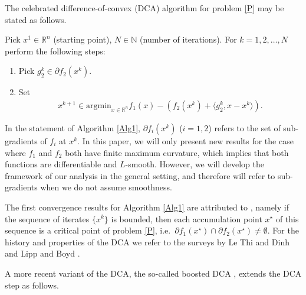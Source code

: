 \documentclass{article} %
\begin{document}
The celebrated difference-of-convex (DCA) algorithm for problem \eqref{P} may be stated as follows.

\begin{algorithm}[H]
\caption{DCA}
\begin{algorithmic}\label{Alg1}
\STATE Pick $x^1\in\mathbb{R}^n$ (starting point), $N \in \mathbb{N}$ (number of iterations).
\STATE For $k=1, 2, \ldots, N$ perform the following steps:\\
\begin{enumerate}
\item Pick  $g_2^{k}\in\partial f_2(x^{k})$.
\item
Set
\begin{align*}
  x^{k+1}\in \text{argmin}_{x\in\mathbb{R}^n} f_1(x)-\left(f_2(x^k)+\langle g_2^k, x-x^k\rangle\right).
\end{align*}
\end{enumerate}
\end{algorithmic}
\end{algorithm}
In the statement of Algorithm \ref{Alg1}, $\partial f_i(x^k)$ ($i=1,2$) refers to the set of sub-gradients of $f_i$ at $x^k$.
{ In this paper, we will only present new results for the case where $f_1$ and $f_2$ both have finite maximum curvature, which implies that both functions are differentiable and $L$-smooth. However, we will develop the framework of our analysis in the general setting, and therefore will refer to sub-gradients when we do not assume smoothness.}

The first convergence results for Algorithm \ref{Alg1} are attributed to \cite[Theorem 3(iv)]{tao1997convex}, namely if the sequence of iterates $\{x^k\}$ is bounded, then each accumulation point $x^\star$ of this sequence  is a critical
 point of problem \eqref{P}, i.e.\ $\partial f_1(x^\star)\cap  \partial f_2(x^\star) \neq \emptyset$.
For the history and properties of the DCA we refer to the surveys by  Le Thi and Dinh \cite{le2018dc,le2024survey} and Lipp and Boyd \cite{Boyde}.

A more recent variant of the DCA, the so-called boosted DCA \cite{Fukushima1981,Boosted_DCA_smooth_MP,Boosted_DCA_nonsmooth_SIOPT}, extends the DCA step as follows.
\end{document}
